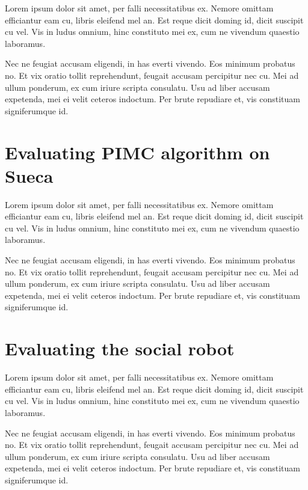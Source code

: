 \label{chapter:results}

Lorem ipsum dolor sit amet, per falli necessitatibus ex. Nemore omittam efficiantur eam cu, libris eleifend mel an. Est reque dicit doming id, dicit suscipit cu vel. Vis in ludus omnium, hinc constituto mei ex, cum ne vivendum quaestio laboramus.

Nec ne feugiat accusam eligendi, in has everti vivendo. Eos minimum probatus no. Et vix oratio tollit reprehendunt, feugait accusam percipitur nec cu. Mei ad ullum ponderum, ex cum iriure scripta consulatu. Usu ad liber accusam expetenda, mei ei velit ceteros indoctum. Per brute repudiare et, vis constituam signiferumque id.

\section{Evaluating PIMC algorithm on Sueca}

Lorem ipsum dolor sit amet, per falli necessitatibus ex. Nemore omittam efficiantur eam cu, libris eleifend mel an. Est reque dicit doming id, dicit suscipit cu vel. Vis in ludus omnium, hinc constituto mei ex, cum ne vivendum quaestio laboramus.

Nec ne feugiat accusam eligendi, in has everti vivendo. Eos minimum probatus no. Et vix oratio tollit reprehendunt, feugait accusam percipitur nec cu. Mei ad ullum ponderum, ex cum iriure scripta consulatu. Usu ad liber accusam expetenda, mei ei velit ceteros indoctum. Per brute repudiare et, vis constituam signiferumque id.

\section{Evaluating the social robot}

Lorem ipsum dolor sit amet, per falli necessitatibus ex. Nemore omittam efficiantur eam cu, libris eleifend mel an. Est reque dicit doming id, dicit suscipit cu vel. Vis in ludus omnium, hinc constituto mei ex, cum ne vivendum quaestio laboramus.

Nec ne feugiat accusam eligendi, in has everti vivendo. Eos minimum probatus no. Et vix oratio tollit reprehendunt, feugait accusam percipitur nec cu. Mei ad ullum ponderum, ex cum iriure scripta consulatu. Usu ad liber accusam expetenda, mei ei velit ceteros indoctum. Per brute repudiare et, vis constituam signiferumque id.



\clearpage


